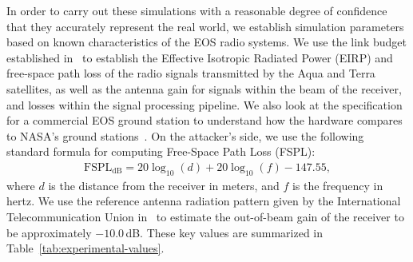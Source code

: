 In order to carry out these simulations with a reasonable degree of confidence that they accurately represent the real world, we establish simulation parameters based on known characteristics of the EOS radio systems.
We use the link budget established in~\cite{quinnNew2003} to establish the Effective Isotropic Radiated Power (EIRP) and free-space path loss of the radio signals transmitted by the Aqua and Terra satellites, as well as the antenna gain for signals within the beam of the receiver, and losses within the signal processing pipeline.
We also look at the specification for a commercial EOS ground station to understand how the hardware compares to NASA's ground stations~\cite{dartcomsystemsltdXBand2021}.
On the attacker's side, we use the following standard formula for computing Free-Space Path Loss (FSPL):
\begin{align}
    \text{FSPL}_{\text{dB}} = 20\log_{10}(d) + 20\log_{10}(f) - 147.55, \label{eq:fspl}
\end{align}
where $d$ is the distance from the receiver in meters, and $f$ is the frequency in hertz.
We use the reference antenna radiation pattern given by the International Telecommunication Union in~\cite{itu2022antenna} to estimate the out-of-beam gain of the receiver to be approximately $-10.0$\,dB.
These key values are summarized in Table~\ref{tab:experimental-values}.

\begin{table}
    \caption{Key values used in overshadowing simulations.}
    \label{tab:experimental-values}
\end{table}

